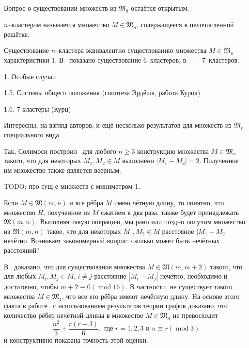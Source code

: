 Вопрос о существовании множеств из $\dot{\mathfrak{M}}_8$
остаётся открытым.

\begin{definition}
	\cite{noll1989nclusters,kurz2013constructing}
	$n$--кластером называется множество $M\in\dot{\mathfrak{M}}_n$,
	содержащееся в целочисленной решётке.
\end{definition}
Существование $n$--кластера эквивалентно существованию множества $M\in\dot{\mathfrak{M}}_n$
характеристики 1.
В~\cite{noll1989nclusters} показано существование 6--кластеров,
в~\cite{kurz2013constructing}~--- 7--кластеров.

1. Особые случаи

1.5. Системы общего положения (гипотеза Эрдёша, работа Курца)
\cite{kreisel2008heptagon}

1.6. 7-кластеры (Курц)


Интересны, на взгляд авторов, и ещё несколько результатов для множеств из $\mathfrak{M}_n$ специального вида.

Так, Солимоси построил~\cite{solymosi2003note} для любого $n\geq 3$ конструкцию множества $M\in\mathfrak{M}_n$
такого, что для некоторых $M_1, M_2 \in M$ выполнено $|M_1 - M_2| = 2$.
Полученное им множество также является веерным.


TODO: про сущ-е множеств с миниметром 1.

Если $M\in\mathfrak{M}(m,n)$ и все рёбра $M$ имею чётную длину,
то понятно, что множество $H$, полученное из $M$ сжатием в два раза,
также будет принадлежать $\mathfrak{M}(m,n)$.
Выполняя такую операцию, мы рано или поздно получим множество из $\mathfrak{M}(m,n)$ такое,
что для некоторых $M_1,M_2\in M$ расстояние $|M_1 - M_2|$ нечётно.
Возникает закономерный вопрос: сколько может быть нечётных расстояний?

В~\cite{graham1974there} доказано, что
для существования множества $M\in\mathfrak{M}(m,m+2)$ такого, что для любых
$M_i,M_j\in M$, $i\neq j$ расстояние $|M_i-M_j|$ нечётно,
необходимо и достаточно, чтобы
$m+2\equiv 0 (\operatorname{mod} 16)$.
В частности, не существует такого множества $M\in\mathfrak{M}_4$,
что все его рёбра имеют нечётную длину.
На основе этого факта в работе~\cite{piepmeyer1996maximum} с использованием результатов теории графов доказано,
что количество рёбер нечётной длины в множестве $M\in\mathfrak{M}_n$ не превосходит
\begin{equation}
	\frac{n^2}{3} + \frac{r(r - 3)}{6}, \mbox{~где~} r = 1, 2, 3 \mbox{~и~} n \equiv r (\operatorname{mod} 3)
\end{equation}
и конструктивно показана точность этой оценки.

